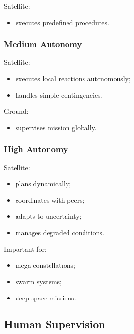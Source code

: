 \documentclass[10pt,a4paper,twocolumn]{article}
\begin{document}
Satellite:
\begin{itemize}
    \item executes predefined procedures.
\end{itemize}


\subsubsection*{Medium Autonomy}

Satellite:
\begin{itemize}
    \item executes local reactions autonomously;
    \item handles simple contingencies.
\end{itemize}

Ground:
\begin{itemize}
    \item supervises mission globally.
\end{itemize}


\subsubsection*{High Autonomy}

Satellite:
\begin{itemize}
    \item plans dynamically;
    \item coordinates with peers;
    \item adapts to uncertainty;
    \item manages degraded conditions.
\end{itemize}

Important for:
\begin{itemize}
    \item mega-constellations;
    \item swarm systems;
    \item deep-space missions.
\end{itemize}


\subsection{Human Supervision}
\end{document}

